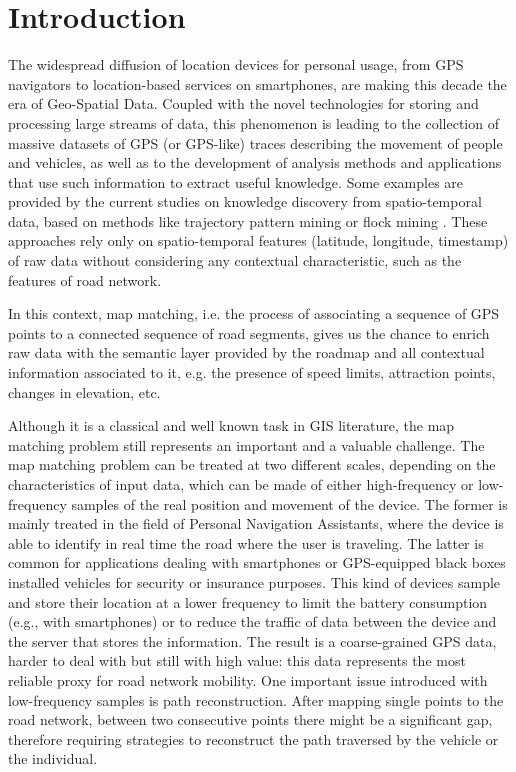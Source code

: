 \documentclass[5p]{elsarticle}
\begin{document}
\section{Introduction}\label{introduction}
The widespread diffusion of location devices for personal usage, from GPS navigators to location-based services on smartphones, are making this decade the era of Geo-Spatial Data.
Coupled with the novel technologies for storing and processing large streams of data, this phenomenon is leading to the collection of massive datasets of GPS (or GPS-like) traces describing the movement of people and vehicles, as well as to the development of analysis methods and applications that use such information to extract useful knowledge.
Some examples are provided by the current studies on knowledge discovery from spatio-temporal data, based on methods like trajectory pattern mining \cite{giannotti2007trajectory} or flock mining \cite{ong2011traffic}. 
These approaches rely only on spatio-temporal features (latitude, longitude, timestamp) of raw data without considering any contextual characteristic, such as the features of road network. 

In this context, map matching, i.e. the process of associating a sequence of GPS points to a connected sequence of road segments, gives us the chance to enrich raw data with the semantic layer provided by the roadmap and all contextual 
information associated to it, e.g. the presence of speed limits, attraction points, changes in elevation, etc.

Although it is a classical and well known task in GIS literature, the map matching problem still represents an important and a valuable challenge. 
The map matching problem can be treated at two different scales, depending on the characteristics of input data, which can be made of either high-frequency or 
low-frequency samples of the real position and movement of the device. The former is mainly treated in the field of Personal Navigation Assistants, where the device is able to identify in real time the road where the user is traveling. 
The latter is common for applications dealing with smartphones or GPS-equipped black boxes installed vehicles for security or insurance purposes.
This kind of devices sample and store their location at a lower frequency to limit the battery consumption (e.g., with smartphones) or to reduce the traffic of 
data between the device and the server that stores the information. The result is a coarse-grained GPS data, harder to deal with but still with high value: this data 
represents the most reliable proxy for road network mobility.
One important issue introduced with low-frequency samples is path reconstruction. After mapping single points to the road network, 
between two consecutive points there might be a significant gap, therefore requiring strategies to reconstruct the path traversed by the vehicle or the individual.
\end{document}
